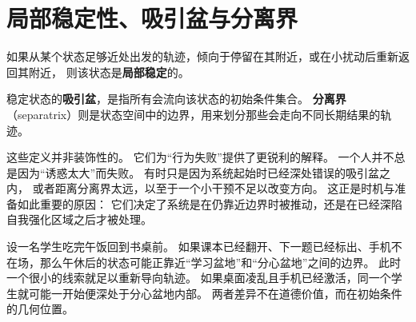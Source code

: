 \section{局部稳定性、吸引盆与分离界}

\begin{definition}[稳定状态]
如果从某个状态足够近处出发的轨迹，倾向于停留在其附近，或在小扰动后重新返回其附近，
则该状态是\textbf{局部稳定}的。
\end{definition}

\begin{definition}[盆地与分离界]
稳定状态的\textbf{吸引盆}，是指所有会流向该状态的初始条件集合。
\textbf{分离界}（separatrix）则是状态空间中的边界，用来划分那些会走向不同长期结果的轨迹。
\end{definition}

\begin{discussion}
这些定义并非装饰性的。
它们为“行为失败”提供了更锐利的解释。
一个人并不总是因为“诱惑太大”而失败。
有时只是因为系统起始时已经深处错误的吸引盆之内，
或者距离分离界太远，以至于一个小干预不足以改变方向。
这正是时机与准备如此重要的原因：
它们决定了系统是在仍靠近边界时被推动，还是在已经深陷自我强化区域之后才被处理。
\end{discussion}

\begin{example}
设一名学生吃完午饭回到书桌前。
如果课本已经翻开、下一题已经标出、手机不在场，那么午休后的状态可能正靠近“学习盆地”和“分心盆地”之间的边界。
此时一个很小的线索就足以重新导向轨迹。
如果桌面凌乱且手机已经激活，同一个学生就可能一开始便深处于分心盆地内部。
两者差异不在道德价值，而在初始条件的几何位置。
\end{example}